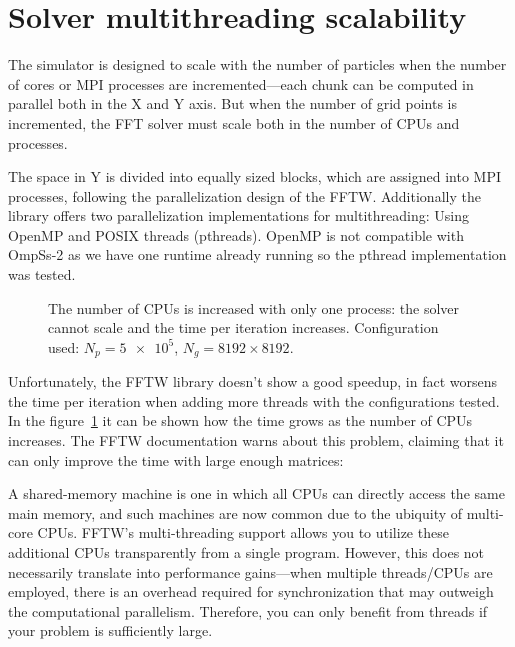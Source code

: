 \section{Solver multithreading scalability}

The simulator is designed to scale with the number of particles when the number 
of cores or MPI processes are incremented---each chunk can be computed in 
parallel both in the X and Y axis. But when the number of grid points is 
incremented, the FFT solver must scale both in the number of CPUs and processes.  

The space in Y is divided into equally sized blocks, which are assigned into MPI 
processes, following the parallelization design of the FFTW. Additionally the 
library offers two parallelization implementations for multithreading: Using 
OpenMP and POSIX threads (pthreads).  OpenMP is not compatible with OmpSs-2 as 
we have one runtime already running so the pthread implementation was tested.
%
\begin{figure}[h]%
	\centering
	\caption{The number of CPUs is increased with only one process: the solver 
	cannot scale and the time per iteration increases. Configuration used: $N_p = 
	\num{5e5}$, $N_g=8192\times8192$.}
	\label{fig:fftw-time}
\end{figure}%
%
Unfortunately, the FFTW library doesn't show a good speedup, in fact worsens the 
time per iteration when adding more threads with the configurations tested. In 
the figure~\ref{fig:fftw-time} it can be shown how the time grows as the number 
of CPUs increases.
%
The FFTW documentation warns about this problem, claiming that it can only 
improve the time with large enough matrices:
%
\begin{displayquote}
A shared-memory machine is one in which all CPUs can directly access the same 
main memory, and such machines are now common due to the ubiquity of multi-core 
CPUs. FFTW’s multi-threading support allows you to utilize these additional CPUs 
transparently from a single program. However, this does not necessarily 
translate into performance gains---when multiple threads/CPUs are employed, 
there is an overhead required for synchronization that may outweigh the 
computational parallelism. Therefore, you can only benefit from threads if your 
problem is sufficiently large.
\end{displayquote}

